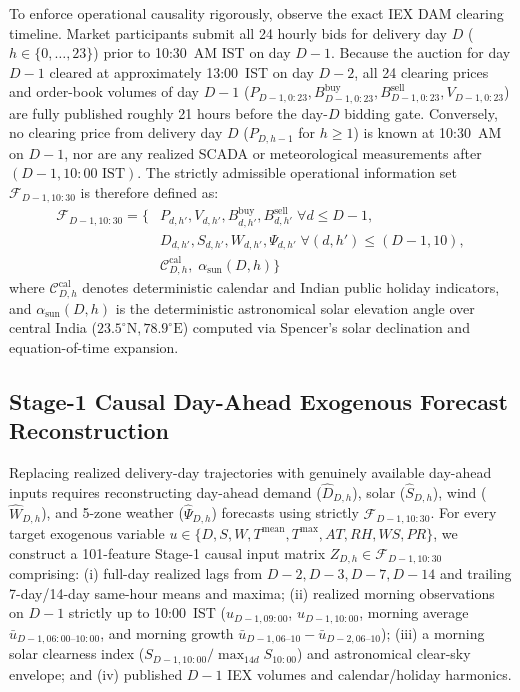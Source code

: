 \documentclass[runningheads,a4paper]{llncs}
\begin{document}
To enforce operational causality rigorously, observe the exact IEX DAM clearing timeline. Market participants submit all 24 hourly bids for delivery day $D$ ($h \in \{0, \dots, 23\}$) prior to 10:30~AM IST on day $D-1$. Because the auction for day $D-1$ cleared at approximately 13:00~IST on day $D-2$, all 24 clearing prices and order-book volumes of day $D-1$ ($P_{D-1, 0:23}, B_{D-1, 0:23}^{\text{buy}}, B_{D-1, 0:23}^{\text{sell}}, V_{D-1, 0:23}$) are fully published roughly 21 hours before the day-$D$ bidding gate. Conversely, no clearing price from delivery day $D$ ($P_{D, h-1}$ for $h \ge 1$) is known at 10:30~AM on $D-1$, nor are any realized SCADA or meteorological measurements after $(D-1, 10:00\text{~IST})$. The strictly admissible operational information set $\mathcal{F}_{D-1, 10:30}$ is therefore defined as:
\begin{equation}
\begin{aligned}
\mathcal{F}_{D-1, 10:30} = \Big\{ & P_{d, h'}, V_{d, h'}, B_{d, h'}^{\text{buy}}, B_{d, h'}^{\text{sell}} \;\forall d \le D-1, \\
& D_{d, h'}, S_{d, h'}, W_{d, h'}, \Psi_{d, h'} \;\forall (d, h') \le (D-1, 10), \\
& \mathcal{C}_{D,h}^{\text{cal}}, \; \alpha_{\text{sun}}(D,h) \Big\}
\end{aligned}
\label{eq:strict_causal_gate}
\end{equation}
where $\mathcal{C}_{D,h}^{\text{cal}}$ denotes deterministic calendar and Indian public holiday indicators, and $\alpha_{\text{sun}}(D,h)$ is the deterministic astronomical solar elevation angle over central India ($23.5^\circ\text{N}, 78.9^\circ\text{E}$) computed via Spencer's solar declination and equation-of-time expansion.

\subsection{Stage-1 Causal Day-Ahead Exogenous Forecast Reconstruction}
Replacing realized delivery-day trajectories with genuinely available day-ahead inputs requires reconstructing day-ahead demand ($\hat{D}_{D,h}$), solar ($\hat{S}_{D,h}$), wind ($\hat{W}_{D,h}$), and 5-zone weather ($\hat{\Psi}_{D,h}$) forecasts using strictly $\mathcal{F}_{D-1, 10:30}$. For every target exogenous variable $u \in \{D, S, W, T^{\text{mean}}, T^{\text{max}}, AT, RH, WS, PR\}$, we construct a 101-feature Stage-1 causal input matrix $Z_{D,h} \in \mathcal{F}_{D-1, 10:30}$ comprising: (i) full-day realized lags from $D-2, D-3, D-7, D-14$ and trailing 7-day/14-day same-hour means and maxima; (ii) realized morning observations on $D-1$ strictly up to 10:00~IST ($u_{D-1, 09:00}$, $u_{D-1, 10:00}$, morning average $\bar{u}_{D-1, 06:00\text{--}10:00}$, and morning growth $\bar{u}_{D-1, 06\text{--}10} - \bar{u}_{D-2, 06\text{--}10}$); (iii) a morning solar clearness index ($S_{D-1, 10:00} / \max_{14d} S_{10:00}$) and astronomical clear-sky envelope; and (iv) published $D-1$ IEX volumes and calendar/holiday harmonics.
\end{document}
